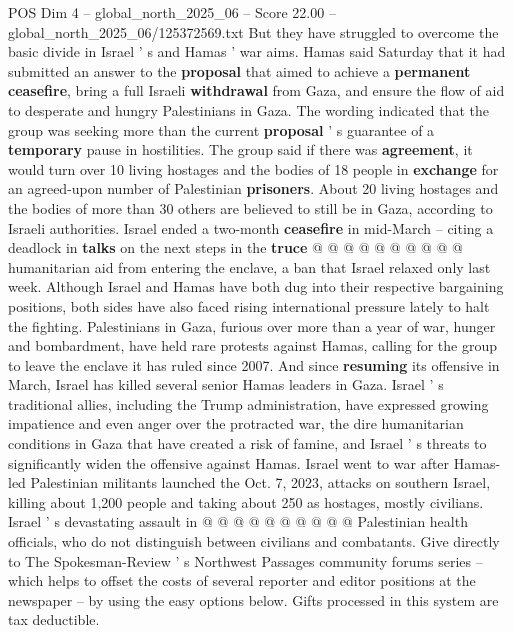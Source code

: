 \begin{textsample}{POS Dim 4 – global\_north\_2025\_06 – Score 22.00 – global\_north\_2025\_06/125372569.txt}
But they have struggled to overcome the basic divide in Israel ' s and Hamas ' war aims.
Hamas said Saturday that it had submitted an answer to the \textbf{proposal} that aimed to achieve a \textbf{permanent} \textbf{ceasefire}, bring a full Israeli \textbf{withdrawal} from Gaza, and ensure the flow of aid to desperate and hungry Palestinians in Gaza.
The wording indicated that the group was seeking more than the current \textbf{proposal} ' s guarantee of a \textbf{temporary} pause in hostilities.
The group said if there was \textbf{agreement}, it would turn over 10 living hostages and the bodies of 18 people in \textbf{exchange} for an agreed-upon number of Palestinian \textbf{prisoners}.
About 20 living hostages and the bodies of more than 30 others are believed to still be in Gaza, according to Israeli authorities.
Israel ended a two-month \textbf{ceasefire} in mid-March -- citing a deadlock in \textbf{talks} on the next steps in the \textbf{truce} @ @ @ @ @ @ @ @ @ @ humanitarian aid from entering the enclave, a ban that Israel relaxed only last week.
Although Israel and Hamas have both dug into their respective bargaining positions, both sides have also faced rising international pressure lately to halt the fighting.
Palestinians in Gaza, furious over more than a year of war, hunger and bombardment, have held rare protests against Hamas, calling for the group to leave the enclave it has ruled since 2007.
And since \textbf{resuming} its offensive in March, Israel has killed several senior Hamas leaders in Gaza.
Israel ' s traditional allies, including the Trump administration, have expressed growing impatience and even anger over the protracted war, the dire humanitarian conditions in Gaza that have created a risk of famine, and Israel ' s threats to significantly widen the offensive against Hamas.
Israel went to war after Hamas-led Palestinian militants launched the Oct. 7, 2023, attacks on southern Israel, killing about 1,200 people and taking about 250 as hostages, mostly civilians.
Israel ' s devastating assault in @ @ @ @ @ @ @ @ @ @ Palestinian health officials, who do not distinguish between civilians and combatants.
Give directly to The Spokesman-Review ' s Northwest Passages community forums series -- which helps to offset the costs of several reporter and editor positions at the newspaper -- by using the easy options below.
Gifts processed in this system are tax deductible.

\end{textsample}
